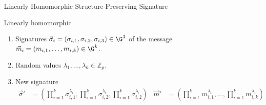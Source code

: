 \begin{frame}{Linearly Homomorphic Structure-Preserving Signature}
  \begin{block}{Linearly homomorphic}
    \begin{enumerate}
    \item Signatures $\vec{\sigma}_i = (\sigma_{i,1}, \sigma_{i,2}, \sigma_{i,3}) \in \G^3$ of the message $\vec{m}_i = (m_{i,1}, \dots, m_{i,k}) \in \G^k$.
    \item Random values $\lambda_1, \dots, \lambda_k \in \mathbb{Z}_p$.
    \item New signature
      \begin{align*}
        \vec{\sigma}' &= (\prod_{i = 1}^k \sigma_{i,1}^{\lambda_i}, \prod_{i = 1}^k \sigma_{i,2}^{\lambda_i}, \prod_{i = 1}^k \sigma_{i,2}^{\lambda_i}) & \vec{m}' &= (\prod_{i = 1}^km_{i,1}^{\lambda_i}, \dots, \prod_{i = 1}^km_{i,k}^{\lambda_i})
      \end{align*}
    \end{enumerate}
  \end{block}
  
\end{frame}
